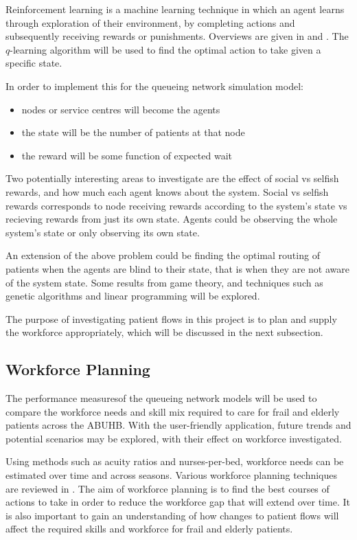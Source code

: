 \documentclass{article}
\begin{document}
Reinforcement learning is a machine learning technique in which an agent learns
through exploration of their environment, by completing actions and subsequently receiving rewards or punishments.
Overviews are given in \cite{suttonbarto98} and \cite{szepesvari10}.
The \(q\)-learning algorithm will be used to find the optimal action to take given a specific state.

In order to implement this for the queueing network simulation model:
\begin{itemize}
    \item nodes or service centres will become the agents
    \item the state will be the number of patients at that node
    \item the reward will be some function of expected wait
\end{itemize}

Two potentially interesting areas to investigate are the effect of social vs selfish rewards, and how much each agent knows about the system.
Social vs selfish rewards corresponds to node receiving rewards according to the system's state vs recieving rewards from just its own state.
Agents could be observing the whole system's state or only observing its own state.

An extension of the above problem could be finding the optimal routing of
patients when the agents are blind to their state, that is when they are not
aware of the system state.
Some results from game theory, and techniques such as genetic algorithms and
linear programming will be explored.

The purpose of investigating patient flows in this project is to plan and supply the workforce appropriately, which will be discussed in the next subsection.

\subsection{Workforce Planning}

The performance measuresof the queueing network models will be used to
compare the workforce needs and skill mix required to care for frail and elderly
patients across the ABUHB.
With the user-friendly application, future trends and potential scenarios may be explored, with their effect on workforce investigated.

Using methods such as acuity ratios and nurses-per-bed, workforce needs can be estimated over time and across seasons.
Various workforce planning techniques are reviewed in \cite{hurst03}.
The aim of workforce planning is to find the best courses of actions to take in
order to reduce the workforce gap that will extend over time.
It is also important to gain an
understanding of how changes to patient flows will affect the required skills
and workforce for frail and elderly patients.
\end{document}

